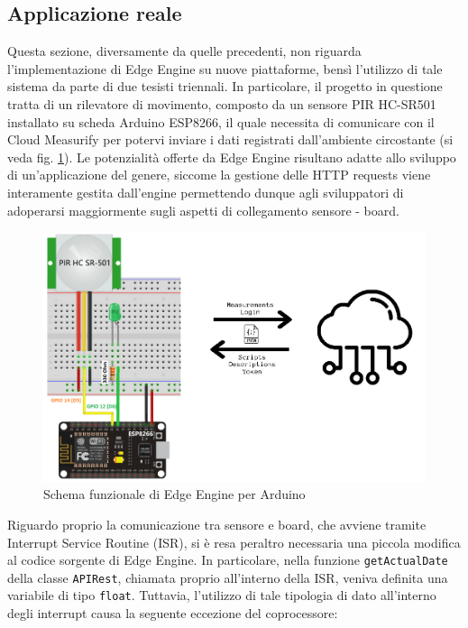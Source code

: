 \subsection{Applicazione reale}
Questa sezione, diversamente da quelle precedenti, non riguarda l’implementazione di Edge Engine su nuove piattaforme, bensì l’utilizzo di tale sistema da parte di due tesisti triennali. In particolare, il progetto in questione tratta di un rilevatore di movimento, composto da un sensore PIR HC-SR501 installato su scheda Arduino ESP8266, il quale necessita di comunicare con il Cloud Measurify per potervi inviare i dati registrati dall'ambiente circostante (si veda fig. \ref{esp8266cloud}). Le potenzialità offerte da Edge Engine risultano adatte allo sviluppo di un’applicazione del genere, siccome la gestione delle HTTP requests viene interamente gestita dall'engine permettendo dunque agli sviluppatori di adoperarsi maggiormente sugli aspetti di collegamento sensore - board.

\begin{figure}[H]
	\centering
	\includegraphics[width=\linewidth]{pics/esp8266cloud}
	\caption{Schema funzionale di Edge Engine per Arduino}
	\label{esp8266cloud}
\end{figure}

Riguardo proprio la comunicazione tra sensore e board, che avviene tramite Interrupt Service Routine (ISR), si è resa peraltro necessaria una piccola modifica al codice sorgente di Edge Engine. In particolare, nella funzione \texttt{getActualDate} della classe \texttt{APIRest}, chiamata proprio all'interno della ISR, veniva definita una variabile di tipo \texttt{float}. Tuttavia, l'utilizzo di tale tipologia di dato all'interno degli interrupt causa la seguente eccezione del coprocessore:

